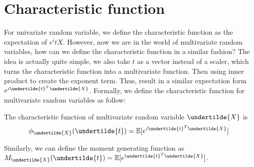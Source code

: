 \documentclass[../MultivariateProbabilityAndRelatedProperties.tex]{subfiles}
\begin{document}
\section{Characteristic function}
For univariate random variable, we define the characteristic function as the expectation of $e^itX$. However, now we are in the world of multivariate random variables, how can we define the characteristic function in a similar fashion? The idea is actually quite simple, we also take $t$ as a vector instead of a scaler, which turns the characteristic function into a multivariate function. Then using inner product to create the exponent term. Thus, result in a similar expectation form $e^{i\undertilde{t}^T\undertilde{X}}$. Formally, we define the characteristic function for multivariate random variables as follow:

\begin{definition}
	The characteristic function of multivariate random variable $\undertilde{X}$ is
	$$\phi_{\undertilde{X}}(\undertilde{t}) = \mathbb{E}[e^{i\undertilde{t}^T\undertilde{X}}]$$
\end{definition}

Similarly, we can define the moment generating function as $M_{\undertilde{X}}(\undertilde{t}) = \mathbb{E}[e^{\undertilde{t}^T\undertilde{X}}]$.
\end{document}
